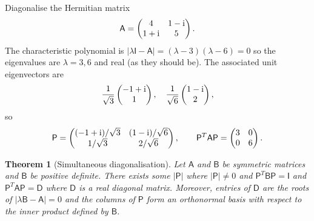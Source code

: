 \documentclass[letter-paper]{tufte-book}
\newtheorem{theorem}{\color{pastel-blue}Theorem}[section]
\newenvironment{example}[1][Example]{\begin{trivlist}
\item[\hskip \labelsep {\bfseries #1}]}{\end{trivlist}}
\newcommand{\zi}{{\rm i}}
\newcommand{\As}{{\mathsf{A}}}
\newcommand{\Bs}{{\mathsf{B}}}
\newcommand{\Ds}{{\mathsf{D}}}
\newcommand{\Is}{{\mathsf{I}}}
\newcommand{\Ps}{{\mathsf{P}}}
\begin{document}
\begin{example}
  Diagonalise the Hermitian matrix
  \begin{align*}
    \As = \begin{pmatrix} 4 & 1-\zi  \\ 1+\zi & 5 \end{pmatrix}.
  \end{align*}
  The characteristic polynomial is $|\lambda\Is - \As| = (\lambda-3)(\lambda-6) = 0$ so the eigenvalues are $\lambda=3, 6$ and real (as they should be). The associated unit eigenvectors are
  \begin{align*}
    \frac{1}{\sqrt{3}}\begin{pmatrix}-1+\zi \\ 1 \end{pmatrix}, \quad \frac{1}{\sqrt{6}}\begin{pmatrix}1-\zi \\ 2 \end{pmatrix},
  \end{align*}
  so
  \begin{align*}
    \Ps = \begin{pmatrix} (-1+\zi)/\sqrt{3} & (1-\zi)/\sqrt{6} \\ 1/\sqrt{3} & 2/\sqrt{6} \end{pmatrix}, \qquad \Ps^T \As \Ps = \begin{pmatrix} 3 & 0 \\ 0 & 6 \end{pmatrix}.
  \end{align*}
\end{example}

\begin{theorem}[Simultaneous diagonalisation]
  Let $\As$ and $\Bs$ be symmetric matrices and $\Bs$ be positive definite. There exists some $|\Ps|$ where $|\Ps|\neq 0$ and $\Ps^T \Bs \Ps = \Is$ and $\Ps^T \As \Ps = \Ds$ where $\Ds$ is a real diagonal matrix. Moreover, entries of $\Ds$ are the roots of $|\lambda \Bs - \As| = 0$ and the columns of $\Ps$ form an orthonormal basis with respect to the inner product defined by $\Bs$.
\end{theorem}
\end{document}
